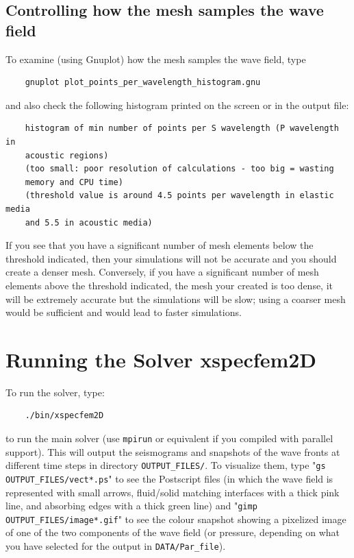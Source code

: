 \documentclass[oneside,english,onecolumn,letterpaper]{book}
\begin{document}
\section{Controlling how the mesh samples the wave field}

To examine (using Gnuplot) how the mesh samples the wave field, type
%
\begin{verbatim}
    gnuplot plot_points_per_wavelength_histogram.gnu
\end{verbatim}
%
and also check the following histogram printed on the screen or in the output file:
%
\begin{verbatim}
    histogram of min number of points per S wavelength (P wavelength in
    acoustic regions)
    (too small: poor resolution of calculations - too big = wasting
    memory and CPU time)
    (threshold value is around 4.5 points per wavelength in elastic media
    and 5.5 in acoustic media)
\end{verbatim}

If you see that you have a significant number of mesh elements below the threshold indicated, then your simulations
will not be accurate and you should create a denser mesh. Conversely, if you have a significant number of mesh elements above the threshold indicated,
the mesh your created is too dense, it will be extremely accurate but the simulations will be slow; using a coarser mesh would be sufficient and would lead to faster simulations.


\chapter{Running the Solver xspecfem2D}


To run the solver, type:
%
\begin{verbatim}
    ./bin/xspecfem2D
\end{verbatim}
%
to run the main solver (use \texttt{mpirun} or equivalent if you compiled with parallel support). This will output the seismograms and snapshots of the wave fronts at different time steps in directory \texttt{OUTPUT\_FILES/}. To visualize them, type "\texttt{gs OUTPUT\_FILES/vect*.ps}" to see the Postscript files (in which the wave field is represented with small arrows, fluid/solid matching interfaces with a thick pink line, and absorbing edges with a thick green line) and "\texttt{gimp OUTPUT\_FILES/image*.gif}" to see the colour snapshot showing a pixelized image of one of the two components of the wave field (or pressure, depending on what you have selected for the output in \texttt{DATA/Par\_file}).
\end{document}
